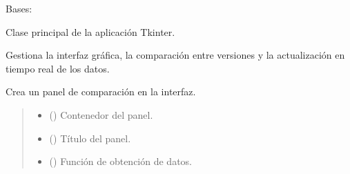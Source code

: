 \documentclass[letterpaper,10pt,spanish]{sphinxmanual}
\begin{document}
\begin{fulllineitems}
\label{\detokenize{main:main.App}}
\pysigstartsignatures
\pysiglinewithargsret
{}
{}
{}
\pysigstopsignatures
\sphinxAtStartPar
Bases: 

\sphinxAtStartPar
Clase principal de la aplicación Tkinter.

\sphinxAtStartPar
Gestiona la interfaz gráfica, la comparación entre versiones
y la actualización en tiempo real de los datos.

\begin{fulllineitems}
\label{\detokenize{main:main.App.crear_panel}}
\pysigstartsignatures
\pysiglinewithargsret
{}
{\sphinxparamcomma {}\sphinxparamcomma {}}
{}
\pysigstopsignatures
\sphinxAtStartPar
Crea un panel de comparación en la interfaz.
\begin{quote}\begin{description}
\begin{itemize}
\item {} 
\sphinxAtStartPar
{} () \textendash{} Contenedor del panel.

\item {} 
\sphinxAtStartPar
{} () \textendash{} Título del panel.

\item {} 
\sphinxAtStartPar
{} () \textendash{} Función de obtención de datos.

\end{itemize}

\end{description}\end{quote}

\end{fulllineitems}



\end{fulllineitems}
\end{document}
